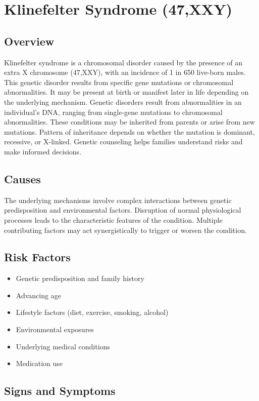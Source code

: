 \chapter{Klinefelter Syndrome (47,XXY)}
\label{sec:Klinefelter Syndrome}

\section{Overview}
Klinefelter syndrome is a chromosomal disorder caused by the presence of an extra X chromosome (47,XXY), with an incidence of 1 in 650 live-born males. This genetic disorder results from specific gene mutations or chromosomal abnormalities. It may be present at birth or manifest later in life depending on the underlying mechanism. Genetic disorders result from abnormalities in an individual's DNA, ranging from single-gene mutations to chromosomal abnormalities. These conditions may be inherited from parents or arise from new mutations. Pattern of inheritance depends on whether the mutation is dominant, recessive, or X-linked. Genetic counseling helps families understand risks and make informed decisions.
\section{Causes}
The underlying mechanisms involve complex interactions between genetic predisposition and environmental factors. Disruption of normal physiological processes leads to the characteristic features of the condition. Multiple contributing factors may act synergistically to trigger or worsen the condition.
\section{Risk Factors}


\begin{itemize}[noitemsep]
  \item Genetic predisposition and family history
  \item Advancing age
  \item Lifestyle factors (diet, exercise, smoking, alcohol)
  \item Environmental exposures
  \item Underlying medical conditions
  \item Medication use
\end{itemize}
\section{Signs and Symptoms}

